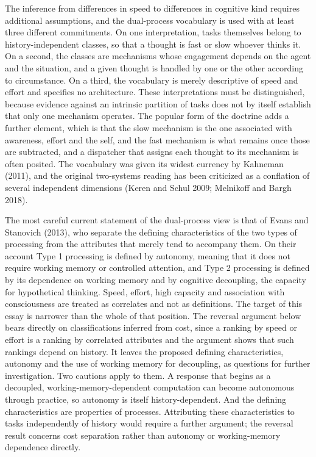 \documentclass[11pt]{article}
\theoremstyle{definition}
\begin{document}
The inference from differences in speed to differences in cognitive kind requires additional assumptions, and the dual-process vocabulary is used with at least three different commitments. On one interpretation, tasks themselves belong to history-independent classes, so that a thought is fast or slow whoever thinks it. On a second, the classes are mechanisms whose engagement depends on the agent and the situation, and a given thought is handled by one or the other according to circumstance. On a third, the vocabulary is merely descriptive of speed and effort and specifies no architecture. These interpretations must be distinguished, because evidence against an intrinsic partition of tasks does not by itself establish that only one mechanism operates. The popular form of the doctrine adds a further element, which is that the slow mechanism is the one associated with awareness, effort and the self, and the fast mechanism is what remains once those are subtracted, and a dispatcher that assigns each thought to its mechanism is often posited. The vocabulary was given its widest currency by Kahneman (2011), and the original two-systems reading has been criticized as a conflation of several independent dimensions (Keren and Schul 2009; Melnikoff and Bargh 2018).

The most careful current statement of the dual-process view is that of Evans and Stanovich (2013), who separate the defining characteristics of the two types of processing from the attributes that merely tend to accompany them. On their account Type 1 processing is defined by autonomy, meaning that it does not require working memory or controlled attention, and Type 2 processing is defined by its dependence on working memory and by cognitive decoupling, the capacity for hypothetical thinking. Speed, effort, high capacity and association with consciousness are treated as correlates and not as definitions. The target of this essay is narrower than the whole of that position. The reversal argument below bears directly on classifications inferred from cost, since a ranking by speed or effort is a ranking by correlated attributes and the argument shows that such rankings depend on history. It leaves the proposed defining characteristics, autonomy and the use of working memory for decoupling, as questions for further investigation. Two cautions apply to them. A response that begins as a decoupled, working-memory-dependent computation can become autonomous through practice, so autonomy is itself history-dependent. And the defining characteristics are properties of processes. Attributing these characteristics to tasks independently of history would require a further argument; the reversal result concerns cost separation rather than autonomy or working-memory dependence directly.
\end{document}
